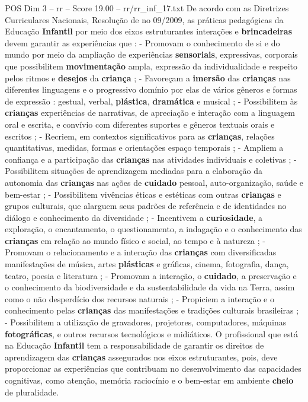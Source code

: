 \begin{textsample}{POS Dim 3 – rr – Score 19.00 – rr/rr\_inf\_17.txt}
De acordo com as Diretrizes Curriculares Nacionais, Resolução de no 09/2009, as práticas pedagógicas da Educação \textbf{Infantil} por meio dos eixos estruturantes interações e \textbf{brincadeiras} devem garantir as experiências que : - Promovam o conhecimento de si e do mundo por meio da ampliação de experiências \textbf{sensoriais}, expressivas, corporais que possibilitem \textbf{movimentação} ampla, expressão da individualidade e respeito pelos ritmos e \textbf{desejos} da \textbf{criança} ; - Favoreçam a \textbf{imersão} das \textbf{crianças} nas diferentes linguagens e o progressivo domínio por elas de vários gêneros e formas de expressão : gestual, verbal, \textbf{plástica}, \textbf{dramática} e musical ; - Possibilitem às \textbf{crianças} experiências de narrativas, de apreciação e interação com a linguagem oral e escrita, e convívio com diferentes suportes e gêneros textuais orais e escritos ; - Recriem, em contextos significativos para as \textbf{crianças}, relações quantitativas, medidas, formas e orientações espaço temporais ; - Ampliem a confiança e a participação das \textbf{crianças} nas atividades individuais e coletivas ; - Possibilitem situações de aprendizagem mediadas para a elaboração da autonomia das \textbf{crianças} nas ações de \textbf{cuidado} pessoal, auto-organização, saúde e bem-estar ; - Possibilitem vivências éticas e estéticas com outras \textbf{crianças} e grupos culturais, que alarguem seus padrões de referência e de identidades no diálogo e conhecimento da diversidade ; - Incentivem a \textbf{curiosidade}, a exploração, o encantamento, o questionamento, a indagação e o conhecimento das \textbf{crianças} em relação ao mundo físico e social, ao tempo e à natureza ; - Promovam o relacionamento e a interação das \textbf{crianças} com diversificadas manifestações de música, artes \textbf{plásticas} e gráficas, cinema, fotografia, dança, teatro, poesia e literatura ; - Promovam a interação, o \textbf{cuidado}, a preservação e o conhecimento da biodiversidade e da sustentabilidade da vida na Terra, assim como o não desperdício dos recursos naturais ; - Propiciem a interação e o conhecimento pelas \textbf{crianças} das manifestações e tradições culturais brasileiras ; - Possibilitem a utilização de gravadores, projetores, computadores, máquinas \textbf{fotográficas}, e outros recursos tecnológicos e midiáticos.
O profissional que está na Educação \textbf{Infantil} tem a responsabilidade de garantir os direitos de aprendizagem das \textbf{crianças} assegurados nos eixos estruturantes, pois, deve proporcionar as experiências que contribuam no desenvolvimento das capacidades cognitivas, como atenção, memória raciocínio e o bem-estar em ambiente \textbf{cheio} de pluralidade.

\end{textsample}
